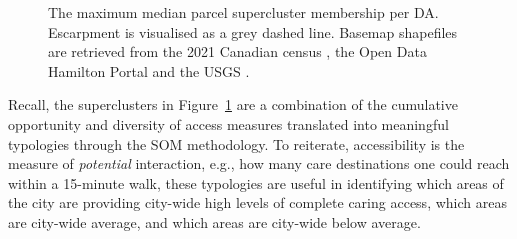 \documentclass[
  authoryear,
  preprint,
  3p]{elsarticle}
\begin{document}
\begin{figure}


\caption{\label{fig-Fig8}The maximum median parcel supercluster
membership per DA. Escarpment is visualised as a grey dashed line.
Basemap shapefiles are retrieved from the 2021 Canadian census
\citep{governmentofcanadaCensusPopulation2023}, the Open Data Hamilton
Portal \citep{opendatahamiltonCityBoundary2023} and the USGS
\citep{greatlakesUSGS2010}.}

\end{figure}%

Recall, the superclusters in Figure~\ref{fig-Fig8} are a combination of
the cumulative opportunity and diversity of access measures translated
into meaningful typologies through the SOM methodology. To reiterate,
accessibility is the measure of \emph{potential} interaction, e.g., how
many care destinations one could reach within a 15-minute walk, these
typologies are useful in identifying which areas of the city are
providing city-wide high levels of complete caring access, which areas
are city-wide average, and which areas are city-wide below average.
\end{document}
